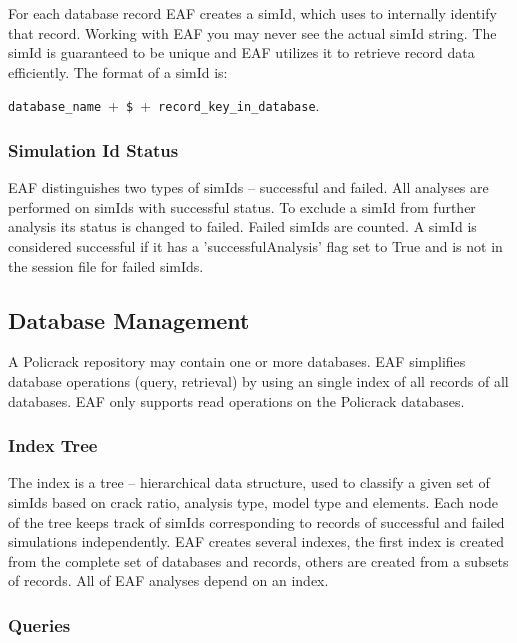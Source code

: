 \documentclass[10pt,a4paper]{article}
\begin{document}
For each database record EAF creates a simId, which uses to internally identify that record. Working with EAF you may never see the actual simId string.
The simId is guaranteed to be unique and EAF utilizes it to retrieve record data efficiently. The format of a simId is:
\begin{center}
\texttt{database\_name}~+~\texttt{\$}~+~\texttt{record\_key\_in\_database}.
\end{center}


\subsubsection{Simulation Id Status}

EAF distinguishes two types of simIds -- successful and failed. All analyses are performed on simIds with successful status. To exclude a simId from further analysis its status is changed to failed. Failed simIds are counted.
A simId is considered successful if it has a 'successfulAnalysis' flag set to True and is not in the session file for failed simIds.


\subsection{Database Management}

A Policrack repository may contain one or more databases. EAF simplifies database operations (query, retrieval) by using an single index of all records of all databases.
EAF only supports read operations on the Policrack databases.


\subsubsection{Index Tree}

The index is a tree -- hierarchical data structure, used to classify a given set of simIds based on crack ratio, analysis type, model type and elements. Each node of the tree keeps track of simIds corresponding to records of successful and failed simulations independently.
EAF creates several indexes, the first index is created from the complete set of databases and records, others are created from a subsets of records.
All of EAF analyses depend on an index.


\subsubsection{Queries}
\end{document}
